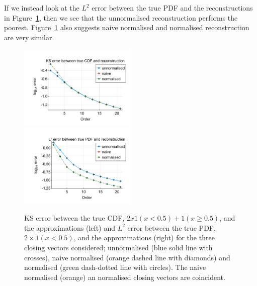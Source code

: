 \begin{example}
If we instead look at the \(L^2\) error between the true PDF and the reconstructions in Figure~\ref{fig: fun 2 ks error qbdrap closing vecs}, then we see that the unnormalised reconstruction performs the poorest. Figure~\ref{fig: fun 2 ks error qbdrap closing vecs} also suggests naive normalised and normalised reconstruction are very similar. 
\begin{figure}
	\centering
	\includegraphics[width=0.5\textwidth,trim={1.25cm 0.8cm 0.25cm 1.25cm},clip]{chapter6/figs/qbdrap_closing_vec/fun2/ks_error_formatted.pdf}%
	\includegraphics[width=0.5\textwidth,trim={1.25cm 0.8cm 0.25cm 1.25cm},clip]{chapter6/figs/qbdrap_closing_vec/fun2/l2_pdf_error_formatted.pdf}
	\caption{KS error between the true CDF, \(2x1(x<0.5)+1(x\geq 0.5)\), and the approximations (left) and \(L^2\) error between the true PDF, \(2\times 1(x<0.5)\), and the approximations (right) for the three closing vectors considered; unnormalised (blue solid line with crosses), naive normalised (orange dashed line with diamonds) and normalised (green dash-dotted line with circles). The naive normalised (orange) an normalised closing vectors are coincident.}
	\label{fig: fun 2 ks error qbdrap closing vecs}
\end{figure}
\end{example}

